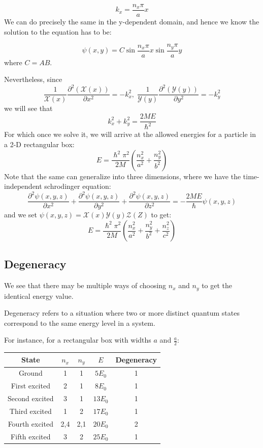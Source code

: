 \documentclass[11pt,fleqn]{book}
\begin{document}
$$k_x=\frac{n_x\pi}{a}x$$ 
We can do precisely the same in the y-dependent domain, and hence we know the solution to the equation has to be:
\begin{proposition}
    $$\psi(x,y)=C\sin \frac{n_x\pi}{a}x\sin\frac{n_y\pi}{a}y$$ where $C=AB$.
\end{proposition}
Nevertheless, since
$$\frac{1}{\mathscr{X}(x)}\frac{\partial^2\left(\mathscr{X}(x)\right)}{\partial x^2}=-k_x^2,\;\frac{1}{\mathscr{Y}(y)}\frac{\partial^2\left(\mathscr{Y}(y)\right)}{\partial y^2}=-k_y^2$$
we will see that
$$k_x^2+k_y^2=\frac{2ME}{\hslash^2}$$
For which once we solve it, we will arrive at the allowed energies for a particle in a 2-D rectangular box:
$$E=\frac{\hslash^2\pi^2}{2M}\left(\frac{n_x^2}{a^2}+\frac{n_y^2}{b^2}\right)$$
Note that the same can generalize into three dimensions, where we have the time-independent schrodinger equation:
$$\frac{\partial^2\psi(x,y,z)}{\partial x^2}+\frac{\partial^2\psi(x,y,z)}{\partial y^2}+\frac{\partial^2\psi(x,y,z)}{\partial z^2}=-\frac{2ME}{\hslash}\psi(x,y,z)$$
and we set $\psi(x,y,z)=\mathscr{X}(x)\mathscr{Y}(y)\mathscr{Z}(Z)$ to get:
$$E=\frac{\hslash^2\pi^2}{2M}\left(\frac{n_x^2}{a^2}+\frac{n_y^2}{b^2}+\frac{n_z^2}{c^2}\right)$$
\subsection{Degeneracy}
We see that there may be multiple ways of choosing $n_x$ and $n_y$ to get the identical energy value. 
\begin{definition}[Degeneracy]
    Degeneracy refers to a situation where two or more distinct quantum states correspond to the same energy level in a system.
\end{definition}
For instance, for a rectangular box with widths $a$ and $\frac{a}{2}$:
\begin{table}[h!]
\centering
\begin{tabular}{c c c c c}
\hline\hline
State & $n_x$ & $n_y$ & $E$ & Degeneracy\\
\hline\hline
Ground & 1 & 1 & $5E_0$ & 1 \\
First excited & 2 & 1 & $8E_0$ & 1 \\
Second excited & 3 & 1 & $13E_0$ & 1 \\
Third excited & 1 & 2 & $17E_0$ & 1 \\
Fourth excited & 2,4 & 2,1 & $20E_0$ & 2 \\
Fifth excited & 3 & 2 & $25E_0$ & 1 \\
\hline
\end{tabular}
\end{table}
\end{document}
